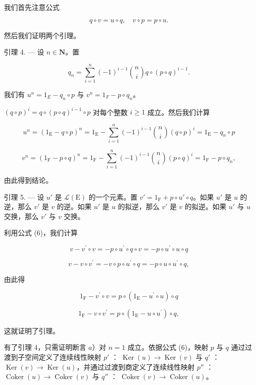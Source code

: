 我们首先注意公式

\[
q \circ v = u \circ q, \quad v \circ p = p \circ u.\tag{6}
\]

然后我们证明两个引理。

引理 4. --- 设 \(n \in \mathbf{N}\)。置

\[
q _ {n} = \sum_ {i = 1} ^ {n} (- 1) ^ {i - 1} \binom {n} {i} q \circ (p \circ q) ^ {i - 1}.
\]

我们有 \(u^{n}=1_{E}-q_{n}\circ p\) 与 \(v^{n}=1_{F}-p\circ q_{n}\)。

\((q\circ p)^{i} = q\circ (p\circ q)^{i - 1}\circ p\) 对每个整数 \(i\geqslant 1\) 成立。然后我们计算

\[
u ^ {n} = (1 _ {\mathrm{E}} - q \circ p) ^ {n} = 1 _ {\mathrm{E}} - \sum_ {i = 1} ^ {n} (- 1) ^ {i - 1} {\binom {n} {i}} (q \circ p) ^ {i} = 1 _ {\mathrm{E}} - q _ {n} \circ p
\]

\[
v ^ {n} = (1 _ {\mathrm{F}} - p \circ q) ^ {n} = 1 _ {\mathrm{F}} - \sum_ {i = 1} ^ {n} (- 1) ^ {i - 1} \binom {n} {i} (p \circ q) ^ {i} = 1 _ {\mathrm{F}} - p \circ q _ {n},
\]

由此得到结论。

引理 5. --- 设 \(u'\) 是 \(\mathcal{L}(\mathrm{E})\) 的一个元素。置 \(v' = 1_{\mathrm{F}} + p \circ u' \circ q\)。如果 \(u'\) 是 \(u\) 的逆，那么 \(v'\) 是 \(v\) 的逆。如果 \(u'\) 是 \(u\) 的拟逆，那么 \(v'\) 是 \(v\) 的拟逆。如果 \(u'\) 与 \(u\) 交换，那么 \(v'\) 与 \(v\) 交换。

利用公式 (6)，我们计算

\[
v - v ^ {\prime} \circ v = - p \circ u ^ {\prime} \circ q \circ v = - p \circ u ^ {\prime} \circ u \circ q
\]

\[
v - v \circ v ^ {\prime} = - v \circ p \circ u ^ {\prime} \circ q = - p \circ u \circ u ^ {\prime} \circ q,
\]

由此得

\[
1 _ {\mathrm{F}} - v ^ {\prime} \circ v = p \circ (1 _ {\mathrm{E}} - u ^ {\prime} \circ u) \circ q
\]

\[
1 _ {\mathrm{F}} - v \circ v ^ {\prime} = p \circ (1 _ {\mathrm{E}} - u \circ u ^ {\prime}) \circ q,
\]

这就证明了引理。

有了引理 4，只需证明断言 \(a\)）对 \(n = 1\) 成立。依据公式 (6)，映射 \(p\) 与 \(q\) 通过过渡到子空间定义了连续线性映射 \(p'\) ： \(\operatorname{Ker}(u) \to \operatorname{Ker}(v)\) 与 \(q'\) ： \(\operatorname{Ker}(v) \to \operatorname{Ker}(u)\)，并通过过渡到商定义了连续线性映射 \(p''\) ： \(\operatorname{Coker}(u) \to \operatorname{Coker}(v)\) 与 \(q''\) ： \(\operatorname{Coker}(v) \to \operatorname{Coker}(u)\)。

